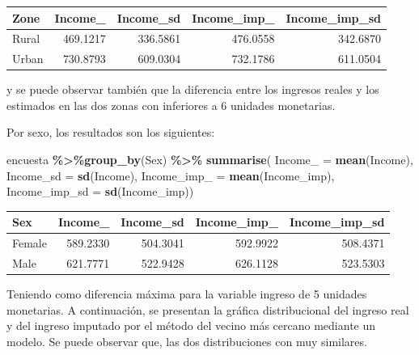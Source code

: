 \documentclass[
  spanish,
  12pt,
]{book}
\newenvironment{Shaded}{\begin{snugshade}}{\end{snugshade}}
\newcommand{\AttributeTok}[1]{\textcolor[rgb]{0.13,0.29,0.53}{#1}}
\newcommand{\FunctionTok}[1]{\textcolor[rgb]{0.13,0.29,0.53}{\textbf{#1}}}
\newcommand{\NormalTok}[1]{#1}
\newcommand{\SpecialCharTok}[1]{\textcolor[rgb]{0.81,0.36,0.00}{\textbf{#1}}}
\begin{document}
\begin{tabular}{l|r|r|r|r}
\hline
Zone & Income\_ & Income\_sd & Income\_imp\_ & Income\_imp\_sd\\
\hline
Rural & 469.1217 & 336.5861 & 476.0558 & 342.6870\\
\hline
Urban & 730.8793 & 609.0304 & 732.1786 & 611.0504\\
\hline
\end{tabular}

y se puede observar también que la diferencia entre los ingresos reales y los estimados en las dos zonas con inferiores a 6 unidades monetarias.

Por sexo, los resultados son los siguientes:

\begin{Shaded}
\begin{Highlighting}[]
\NormalTok{encuesta }\SpecialCharTok{\%\textgreater{}\%}\FunctionTok{group\_by}\NormalTok{(Sex) }\SpecialCharTok{\%\textgreater{}\%}  \FunctionTok{summarise}\NormalTok{(}
  \AttributeTok{Income\_ =} \FunctionTok{mean}\NormalTok{(Income),}
  \AttributeTok{Income\_sd =} \FunctionTok{sd}\NormalTok{(Income),}
  \AttributeTok{Income\_imp\_ =} \FunctionTok{mean}\NormalTok{(Income\_imp),}
  \AttributeTok{Income\_imp\_sd =} \FunctionTok{sd}\NormalTok{(Income\_imp))}
\end{Highlighting}
\end{Shaded}

\begin{tabular}{l|r|r|r|r}
\hline
Sex & Income\_ & Income\_sd & Income\_imp\_ & Income\_imp\_sd\\
\hline
Female & 589.2330 & 504.3041 & 592.9922 & 508.4371\\
\hline
Male & 621.7771 & 522.9428 & 626.1128 & 523.5303\\
\hline
\end{tabular}

Teniendo como diferencia máxima para la variable ingreso de 5 unidades monetarias. A continuación, se presentan la gráfica distribucional del ingreso real y del ingreso imputado por el método del vecino más cercano mediante un modelo. Se puede observar que, las dos distribuciones con muy similares.
\end{document}

